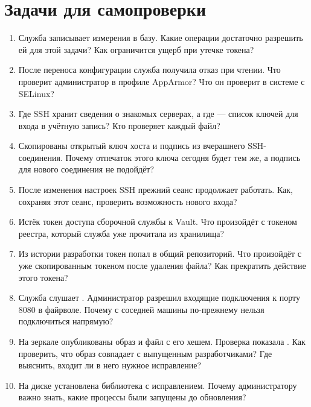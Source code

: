 \section{Задачи для самопроверки}
\begin{enumerate}
  \item Служба записывает измерения в базу. Какие операции достаточно
    разрешить ей для этой задачи? Как ограничится ущерб при утечке токена?
  \item После переноса конфигурации служба получила отказ при чтении.
    Что проверит администратор в профиле AppArmor? Что он проверит
    в системе с SELinux?
  \item Где SSH хранит сведения о знакомых серверах, а где ---
    список ключей для входа в учётную запись? Кто проверяет каждый файл?
  \item Скопированы открытый ключ хоста и подпись из вчерашнего
    SSH-соединения. Почему отпечаток этого ключа сегодня будет тем же,
    а подпись для нового соединения не подойдёт?
  \item После изменения настроек SSH прежний сеанс продолжает работать.
    Как, сохраняя этот сеанс, проверить возможность нового входа?
  \item Истёк токен доступа сборочной службы к Vault. Что произойдёт с
    токеном реестра, который служба уже прочитала из хранилища?
  \item Из истории разработки токен попал в общий репозиторий.
    Что произойдёт с уже скопированным токеном после удаления файла?
    Как прекратить действие этого токена?
  \item Служба слушает . Администратор разрешил
    входящие подключения к порту 8080 в файрволе. Почему
    с соседней машины по-прежнему нельзя подключиться напрямую?
  \item На зеркале опубликованы образ и файл с его хешем. Проверка
    показала . Как проверить, что образ совпадает с выпущенным
    разработчиками? Где выяснить, входит ли в него нужное исправление?
  \item На диске установлена библиотека с исправлением. Почему
    администратору важно знать, какие процессы были запущены до обновления?
\end{enumerate}
